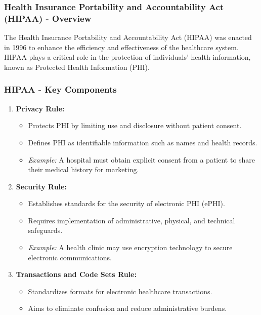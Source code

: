 \documentclass{beamer}
\begin{document}
\begin{frame}[fragile]
    \frametitle{Health Insurance Portability and Accountability Act (HIPAA) - Overview}
    The Health Insurance Portability and Accountability Act (HIPAA) was enacted in 1996 to enhance 
    the efficiency and effectiveness of the healthcare system. HIPAA plays a critical role in the 
    protection of individuals' health information, known as Protected Health Information (PHI).
\end{frame}

\begin{frame}[fragile]
    \frametitle{HIPAA - Key Components}
    \begin{enumerate}
        \item \textbf{Privacy Rule:}
        \begin{itemize}
            \item Protects PHI by limiting use and disclosure without patient consent.
            \item Defines PHI as identifiable information such as names and health records.
            \item \textit{Example:} A hospital must obtain explicit consent from a patient to share 
            their medical history for marketing.
        \end{itemize}
        
        \item \textbf{Security Rule:}
        \begin{itemize}
            \item Establishes standards for the security of electronic PHI (ePHI).
            \item Requires implementation of administrative, physical, and technical safeguards.
            \item \textit{Example:} A health clinic may use encryption technology to secure 
            electronic communications.
        \end{itemize}
        
        \item \textbf{Transactions and Code Sets Rule:}
        \begin{itemize}
            \item Standardizes formats for electronic healthcare transactions.
            \item Aims to eliminate confusion and reduce administrative burdens.
        \end{itemize}
        

\end{enumerate}
\end{frame}
\end{document}
